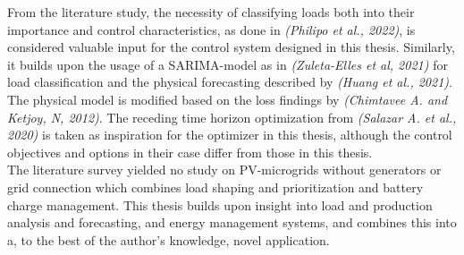 From the literature study, the necessity of classifying loads both into their importance and control characteristics, as done in \textit{(Philipo et al., 2022)}\cite{Philipo2022-rx}, is considered valuable input for the control system designed in this thesis. Similarly, it builds upon the usage of a SARIMA-model as in \textit{(Zuleta-Elles et al, 2021)}\cite{Zuleta-Elles2021-qh} for load classification and the physical forecasting described by \textit{(Huang et al., 2021)}\cite{Huang2010-lv}. The physical model is modified based on the loss findings by \textit{(Chimtavee A. and Ketjoy, N, 2012)}\cite{Chimtavee2012-gg}. The receding time horizon optimization from \textit{(Salazar A. et al., 2020)}\cite{Salazar2020-al} is taken as inspiration for the optimizer in this thesis, although the  control objectives and options in their case differ from those in this thesis.\\

The literature survey yielded no study on PV-microgrids without generators or grid connection which combines load shaping and prioritization and battery charge management. This thesis builds upon insight into load and production analysis and forecasting, and energy management systems, and combines this into a, to the best of the author's knowledge, novel application.




